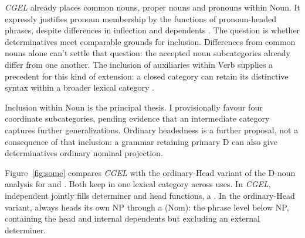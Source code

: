 \documentclass[12pt]{article}
\begin{document}
\textit{CGEL} already places common nouns, proper nouns and pronouns within Noun. It expressly justifies pronoun membership by the functions of pronoun-headed phrases, despite differences in inflection and dependents \citep[327--328]{huddleston2002}. The question is whether determinatives meet comparable grounds for inclusion. Differences from common nouns alone can't settle that question: the accepted noun subcategories already differ from one another. The inclusion of auxiliaries within Verb supplies a precedent for this kind of extension: a closed category can retain its distinctive syntax within a broader lexical category \citep{pullumwilson1977}.

Inclusion within Noun is the principal thesis. I provisionally favour four coordinate subcategories, pending evidence that an intermediate category captures further generalizations. Ordinary headedness is a further proposal, not a consequence of that inclusion: a grammar retaining primary D can also give determinatives ordinary nominal projection.

Figure~\ref{fig:some} compares \textit{CGEL} with the ordinary-Head variant of the D-noun analysis for  and . Both keep  in one lexical category across uses. In \textit{CGEL}, independent  jointly fills determiner and head functions, a  \citep[410--412]{huddleston2002}. In the ordinary-Head variant,  always heads its own NP through a  (Nom): the phrase level below NP, containing the head and internal dependents but excluding an external determiner.
\end{document}
